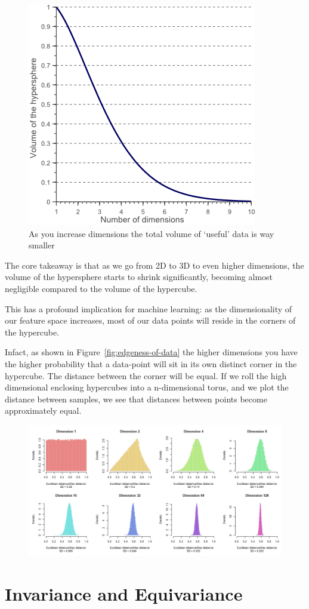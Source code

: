 \documentclass[11pt]{article}
\begin{document}
\begin{figure}[H]
    \centering
    \includegraphics*[width=.4\linewidth]{figures/hypersphere.png}
    \caption{As you increase dimensions the total volume of `useful' data is way smaller}
\end{figure}

The core takeaway is that as we go from 2D to 3D to even higher dimensions, the volume of the hypersphere starts to shrink significantly, becoming almost negligible compared to the volume of the hypercube.

This has a profound implication for machine learning: as the dimensionality of our feature space increases, most of our data points will reside in the corners of the hypercube.

Infact, as shown in Figure~\ref{fig:edgeness-of-data} the higher dimensions you have the higher probability that a data-point will sit in its own distinct corner in the hypercube. The distance between the corner will be equal. If we roll the high dimensional enclosing hypercubes into a n-dimensional torus, and we plot the distance between samples, we see that distances between points become approximately equal.

\begin{figure}[H]
    \centering
    \includegraphics[width=.6\textwidth]{figures/distnace-between-points.png}
\end{figure}

\section{Invariance and Equivariance}
\end{document}
